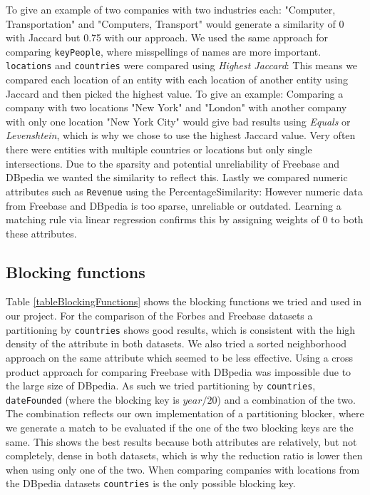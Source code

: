 To give an example of two companies with two industries each: "Computer, Transportation" and "Computers, Transport" would generate a similarity of 0 with Jaccard but 0.75 with our approach. We used the same approach for comparing \texttt{keyPeople}, where misspellings of names are more important. \texttt{locations} and \texttt{countries} were compared using \textit{Highest Jaccard}: This means we compared each location of an entity with each location of another entity using Jaccard and then picked the highest value. To give an example: Comparing a company with two locations "New York" and "London" with another company with only one location "New York City" would give bad results using \textit{Equals} or \textit{Levenshtein}, which is why we chose to use the highest Jaccard value. Very often there were entities with multiple countries or locations but only single intersections. Due to the sparsity and potential unreliability of Freebase and DBpedia we wanted the similarity to reflect this. Lastly we compared numeric attributes such as \texttt{Revenue} using the PercentageSimilarity: However numeric data from Freebase and DBpedia is too sparse, unreliable or outdated. Learning a matching rule via linear regression confirms this by assigning weights of 0 to both these attributes.





	
	
\subsection{Blocking functions}
Table \ref{tableBlockingFunctions} shows the blocking functions we tried and used in our project. For the comparison of the Forbes and Freebase datasets a partitioning by \texttt{countries} shows good results, which is consistent with the high density of the attribute in both datasets. We also tried a sorted neighborhood approach on the same attribute which seemed to be less effective. Using a cross product approach for comparing Freebase with DBpedia was impossible due to the large size of DBpedia. As such we tried partitioning by \texttt{countries}, \texttt{dateFounded} (where the blocking key is $year/20$) and a combination of the two. The combination reflects our own implementation of a partitioning blocker, where we generate a match to be evaluated if the one of the two blocking keys are the same. This shows the best results because both attributes are relatively, but not completely, dense in both datasets, which is why the reduction ratio is lower then when using only one of the two. When comparing companies with locations from the DBpedia datasets \texttt{countries} is the only possible blocking key. 

